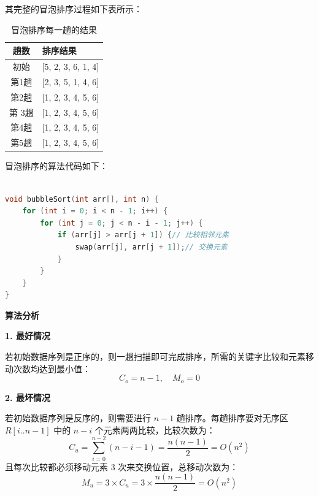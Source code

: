 \documentclass[lang=cn,newtx,10pt,scheme=chinese]{../elegantbook}
\begin{document}
其完整的冒泡排序过程如下表所示：
\begin{table}[!htbp]
\centering
\caption{冒泡排序每一趟的结果}

\label{tab:bubbleSort}

\begin{tabular}{|c|l|}
\hline
\textbf{趟数} & \textbf{排序结果} \\ \hline

初始 & [5, 2, 3, 6, 1, 4] \\ \hline

第1趟 & [2, 3, 5, 1, 4, 6] \\ \hline

第2趟 & [1, 2, 3, 4, 5, 6] \\ \hline

第 3趟 & [1, 2, 3, 4, 5, 6] \\ \hline

第4趟 & [1, 2, 3, 4, 5, 6] \\ \hline

第5趟 & [1, 2, 3, 4, 5, 6] \\ \hline
\end{tabular}

\end{table}

冒泡排序的算法代码如下：

\begin{lstlisting}[language=C++, caption=冒泡排序的算法代码]

void bubbleSort(int arr[], int n) {
    for (int i = 0; i < n - 1; i++) {
        for (int j = 0; j < n - i - 1; j++) {
            if (arr[j] > arr[j + 1]) {// 比较相邻元素
                swap(arr[j], arr[j + 1]);// 交换元素
            }
        }
    }
}

\end{lstlisting}

\textbf{算法分析}

\textbf{1. 最好情况  }

   若初始数据序列是正序的，则一趟扫描即可完成排序，所需的关键字比较和元素移动次数均达到最小值：
   \[
   C_o = n - 1, \quad M_o = 0
   \]

\textbf{2. 最坏情况  }

   若初始数据序列是反序的，则需要进行 $n - 1$ 趟排序。每趟排序要对无序区 $R[i..n-1]$ 中的 $n - i$ 个元素两两比较，比较次数为：
   \[
   C_u = \sum_{i=0}^{n-2} (n - i - 1) = \frac{n(n-1)}{2} = O(n^2)
   \]
   且每次比较都必须移动元素 3 次来交换位置，总移动次数为：
   \[
   M_u = 3 \times C_u = 3 \times \frac{n(n-1)}{2} = O(n^2)
   \]
\end{document}
